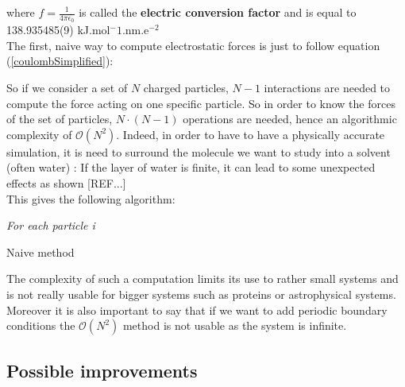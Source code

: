 \documentclass[11pt,twoside,a4paper]{report}
\begin{document}
where $f=\frac{1}{4\pi\epsilon_0}$ is called the \textbf{electric conversion factor} and is equal to 138.935485(9) kJ.mol$^-1$.nm.e$^{-2}$\\


The first, naive way to compute electrostatic forces is just to follow equation (\ref{coulombSimplified}):

So if we consider a set of $N$ charged particles, $N-1$ interactions are needed to compute the force acting on one specific particle. So in order to know the forces of the set of particles, $N\cdot(N-1)$ operations are needed, hence an algorithmic complexity of $\mathcal{O}(N^2)$. Indeed, in order to have to have a physically accurate simulation, it is need to surround the molecule we want to study into a solvent (often water) : If the layer of water is finite, it can lead to some unexpected effects as shown [REF...]\\

This gives the following algorithm:

\IncMargin{1em}
\begin{algorithm}[H]



\BlankLine

\emph{For each particle i}\;
\caption{Naive method}\label{algo_disjdecomp}
\end{algorithm}\DecMargin{1em}


The complexity of such a computation limits its use to rather small systems and is not really usable for bigger systems such as proteins or astrophysical systems.
 Moreover it is also important to say that if we want to add periodic boundary conditions the $\mathcal{O}(N^2)$ method is not usable as the system is infinite.


\subsection{Possible improvements}
\end{document}
